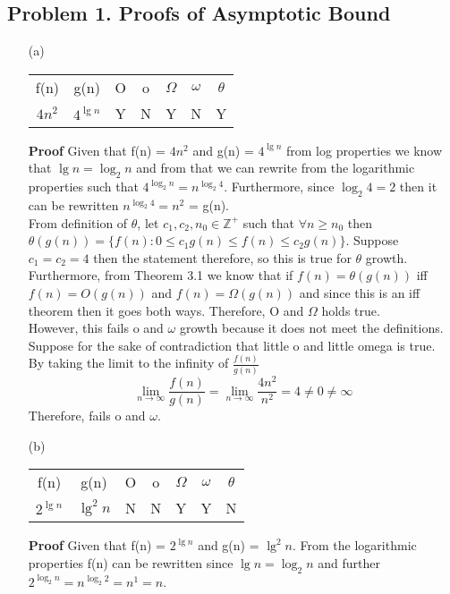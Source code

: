 \documentclass[12pt]{article}
\begin{document}
\subsection*{Problem 1. Proofs of Asymptotic Bound}
\begin{itemize}
    \item[(a)]
    \begin{center}
    \begin{tabular} {|c|c|c|c|c|c|c|}
    f(n) & g(n) & O & o & $\Omega$ & $\omega$ & $\theta$ \\ 
    $4n^2$ & $4^{\lg n}$ & Y & N & Y & N & Y 
    \end{tabular}
\end{center}
\textbf{Proof}
Given that f(n) = $4n^2$ and g(n) = $4^{\lg n}$ from log properties we know that $\lg n = \log_{2} n$ and from that we can rewrite from the logarithmic properties such that $4^{\log_2 n} = n^{\log_2 4}$. Furthermore, since $\log_2 4 = 2$ then it can be rewritten $n^{\log_2 4} = n^2$ = g(n). \\
From definition of $\theta$, let $c_1, c_2, n_0 \in \mathbb{Z^{+}}$ such that $\forall n  \geq n_0$ then $\theta(g(n)) = \{f(n) : 0 \leq c_1 g(n) \leq f(n) \leq c_2 g(n)\}$. Suppose $c_1 = c_2 = 4$ then the statement therefore, so this is true for $\theta$ growth. Furthermore, from Theorem 3.1 we know that if $f(n) = \theta(g(n))$ iff $f(n) = O(g(n))$ and $f(n) = \Omega(g(n))$ and since this is an iff theorem then it goes both ways. Therefore, O and $\Omega$ holds true. \\
However, this fails o and $\omega$ growth because it does not meet the definitions. Suppose for the sake of contradiction that little o and little omega is true. \\
By taking the limit to the infinity of $\frac{f(n)}{g(n)}$ 
\begin{equation*}
    \lim_{n \to \infty} \frac{f(n)}{g(n)} = \lim_{n \to \infty} \frac{4n^2}{n^2} = 4 \neq 0 \neq \infty
\end{equation*}
Therefore, fails o and $\omega$. 
\item[(b)] 
 \begin{center}
    \begin{tabular} {|c|c|c|c|c|c|c|}
    f(n) & g(n) & O & o & $\Omega$ & $\omega$ & $\theta$ \\ 
    $2^{\lg n}$ & $\lg^2 n$ & N & N & Y & Y & N
    \end{tabular}
    \end{center}
\textbf{Proof} Given that f(n) = $2^{\lg n}$ and g(n) = $\lg^2 n$. From the logarithmic properties f(n) can be rewritten since $\lg n = \log_2 n $ and further $2^{\log_2 n} = n^{\log_2 2} = n^{1} = n$. \\

\end{itemize}
\end{document}

